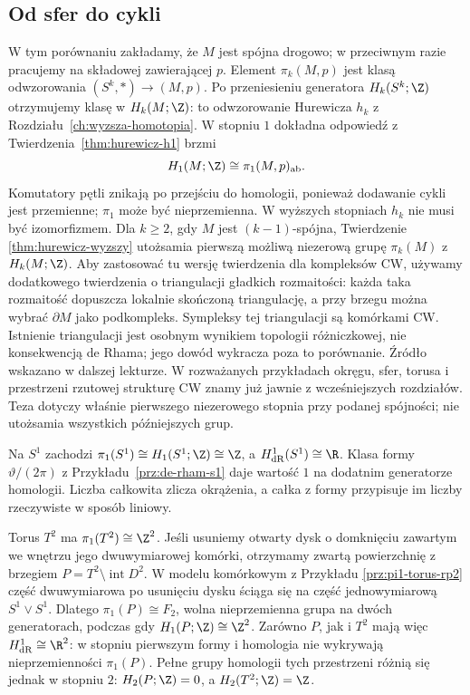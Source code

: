 \subsection*{Od sfer do cykli}

W tym porównaniu zakładamy, że $M$ jest spójna drogowo;
w przeciwnym razie pracujemy na składowej zawierającej $p$.
Element $\pi_k(M,p)$ jest klasą odwzorowania
$(S^k,*)\to(M,p)$. Po przeniesieniu generatora
$H_k(S^k;\Z)$ otrzymujemy klasę w $H_k(M;\Z)$:
to odwzorowanie Hurewicza $h_k$
z Rozdziału~\ref{ch:wyzsza-homotopia}.
W stopniu $1$ dokładna odpowiedź z
Twierdzenia~\ref{thm:hurewicz-h1} brzmi
\[
 H_1(M;\Z)\cong\pi_1(M,p)_{\mathrm{ab}}.
\]
Komutatory pętli znikają po przejściu
do homologii, ponieważ dodawanie cykli
jest przemienne; $\pi_1$ może być nieprzemienna.
W wyższych stopniach $h_k$ nie musi być
izomorfizmem. Dla $k\geq2$, gdy $M$ jest
$(k-1)$-spójna, Twierdzenie
\ref{thm:hurewicz-wyzszy} utożsamia
pierwszą możliwą niezerową grupę
$\pi_k(M)$ z $H_k(M;\Z)$.
Aby zastosować tu wersję twierdzenia dla kompleksów CW,
używamy dodatkowego twierdzenia o triangulacji gładkich
rozmaitości: każda taka rozmaitość dopuszcza lokalnie
skończoną triangulację, a przy brzegu można wybrać
$\partial M$ jako podkompleks. Sympleksy tej triangulacji
są komórkami CW. Istnienie triangulacji jest osobnym
wynikiem topologii różniczkowej, nie konsekwencją de Rhama;
jego dowód wykracza poza to porównanie. Źródło wskazano
w dalszej lekturze. W rozważanych przykładach okręgu,
sfer, torusa i przestrzeni rzutowej strukturę CW znamy
już jawnie z wcześniejszych rozdziałów.
Teza dotyczy właśnie pierwszego
niezerowego stopnia przy podanej spójności;
nie utożsamia wszystkich późniejszych grup.

\begin{przyklad}
Na $S^1$ zachodzi
$\pi_1(S^1)\cong H_1(S^1;\Z)\cong\Z$,
a $H^1_{\mathrm{dR}}(S^1)\cong\R$.
Klasa formy $\vartheta/(2\pi)$ z
Przykładu~\ref{prz:de-rham-s1} daje wartość
$1$ na dodatnim generatorze homologii.
Liczba całkowita zlicza okrążenia, a całka
z formy przypisuje im liczby rzeczywiste
w sposób liniowy.
\end{przyklad}

\begin{przyklad}
Torus $T^2$ ma $\pi_1(T^2)\cong\Z^2$.
Jeśli usuniemy otwarty dysk o domknięciu zawartym
we wnętrzu jego dwuwymiarowej komórki,
otrzymamy zwartą powierzchnię z brzegiem
$P=T^2\setminus\operatorname{int}D^2$.
W modelu komórkowym z Przykładu
\ref{prz:pi1-torus-rp2} część
dwuwymiarowa po usunięciu dysku ściąga się
na część jednowymiarową $S^1\vee S^1$.
Dlatego $\pi_1(P)\cong F_2$, wolna
nieprzemienna grupa na dwóch generatorach,
podczas gdy $H_1(P;\Z)\cong\Z^2$.
Zarówno $P$, jak i $T^2$ mają więc
$H^1_{\mathrm{dR}}\cong\R^2$:
w stopniu pierwszym formy i homologia
nie wykrywają nieprzemienności $\pi_1(P)$.
Pełne grupy homologii tych przestrzeni
różnią się jednak w stopniu $2$:
$H_2(P;\Z)=0$, a $H_2(T^2;\Z)=\Z$.
\end{przyklad}

